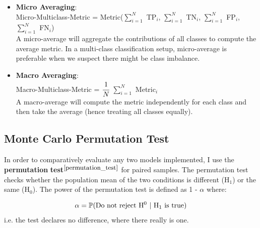     \begin{itemize}
        \item \textbf{Micro Averaging}: \\
            Micro-Multiclass-Metric = Metric($\sum_{i=1}^{N}$ TP$_i$, $\sum_{i=1}^{N}$ TN$_i$, $\sum_{i=1}^{N}$ FP$_i$, $\sum_{i=1}^{N}$ FN$_i$) \\
             A micro-average will aggregate the contributions of all classes to compute the average metric. In a multi-class classification setup, micro-average is preferable when we suspect there might be class imbalance.
            
        \item \textbf{Macro Averaging}: \\
            Macro-Multiclass-Metric = $\cfrac{1}{N}$ $\sum_{i=1}^{N}$ Metric$_i$ \\
            A macro-average will compute the metric independently for each class and then take the average (hence treating all classes equally).
    \end{itemize}
    
    
    
    \subsection{Monte Carlo Permutation Test}
    
    In order to comparatively evaluate any two models implemented, I use the \textbf{permutation} \textbf{test}$^{\small \cite{permutation_test}}$ for paired samples. The permutation test checks whether the population mean of the two conditions is different (H$_1$) or the same (H$_0$). The power of the permutation test is defined as 1 - $\alpha$ where: 
    
    \begin{equation}
        \centering
        \alpha = \mathbb{P}(\text{Do not reject H$^0$ | H$_1$ is true}) \newline
    \end{equation}    
    i.e. the test declares no difference, where there really is one. \\
    
